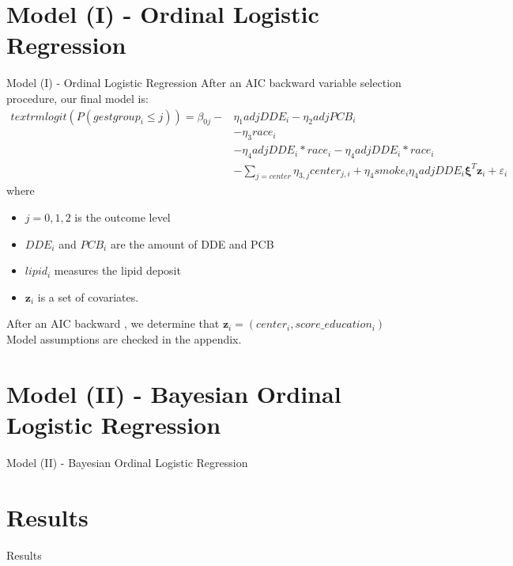 \documentclass{beamer}\usepackage[]{graphicx}\usepackage[]{color}
\begin{document}
\section{Model (I) - Ordinal Logistic Regression}
\begin{frame}{Model (I) - Ordinal Logistic Regression}
\footnotesize
After an AIC backward variable selection procedure, our final model is:
\begin{align*}
textrm{logit}(P(gestgroup_i \leq j)) = \beta_{0j} - &\eta_1adjDDE_i - \eta_2adjPCB_i \\
&-\eta_3 race_i \\
&-\eta_4adjDDE_i*race_i -\eta_4adjDDE_i*race_i \\
&- \sum_{j = center}\eta_{3,j}center_{j,i} + \eta_4smoke_i \eta_4adjDDE_i\boldsymbol{\xi}^T\mathbf{z}_i + \varepsilon_i
\end{align*}
where 
\begin{itemize}
\item $j = 0,1,2$ is the outcome level
\item $DDE_i$ and $PCB_i$ are the amount of DDE and PCB
\item $lipid_i$ measures the lipid deposit 
\item $\mathbf{z}_i$ is a set of covariates. 
\end{itemize}
After an AIC backward , we determine that $\mathbf{z}_i = (center_i, score\_education_i)$\\
Model assumptions are checked in the appendix.
\end{frame}
\section{Model (II) - Bayesian Ordinal Logistic Regression}
\begin{frame}{Model (II) - Bayesian Ordinal Logistic Regression}
\end{frame}

\section{Results}
\begin{frame}{Results}
\end{frame}


\end{document}
